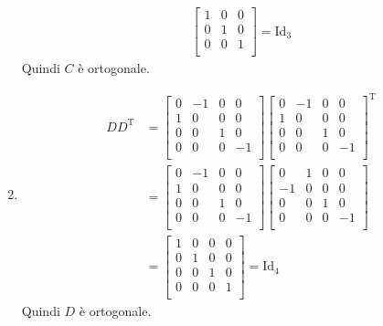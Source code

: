 \documentclass{article}
\newcommand*{\m}[1]{\begin{bmatrix}#1\end{bmatrix}}
\begin{document}
\begin{enumerate}
\begin{equation*}
\begin{aligned}
        \m{
            1 & 0 & 0 \\
            0 & 1 & 0 \\
            0 & 0 & 1 \\
        } = \text{Id}_3
    \end{aligned}\end{equation*}
    Quindi $C$ è ortogonale.
    \item \begin{equation*}\begin{aligned}
        DD^\text{T} &=
        \m{
            0 & -1 & 0 & 0 \\
            1 & 0 & 0 & 0 \\
            0 & 0 & 1 & 0 \\
            0 & 0 & 0 & -1 \\
        }
        \m{
            0 & -1 & 0 & 0 \\
            1 & 0 & 0 & 0 \\
            0 & 0 & 1 & 0 \\
            0 & 0 & 0 & -1 \\
        }^\text{T} \\ &=
        \m{
            0 & -1 & 0 & 0 \\
            1 & 0 & 0 & 0 \\
            0 & 0 & 1 & 0 \\
            0 & 0 & 0 & -1 \\
        }
        \m{
            0 & 1 & 0 & 0 \\
            -1 & 0 & 0 & 0 \\
            0 & 0 & 1 & 0 \\
            0 & 0 & 0 & -1 \\
        } \\ &=
        \m{
            1 & 0 & 0 & 0 \\
            0 & 1 & 0 & 0 \\
            0 & 0 & 1 & 0 \\
            0 & 0 & 0 & 1 \\
        } = \text{Id}_4
    \end{aligned}\end{equation*}
    Quindi $D$ è ortogonale.
\end{enumerate}
\end{document}
